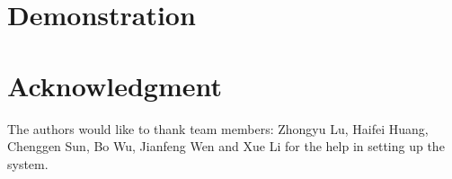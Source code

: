 \documentclass[10pt,conference,balance,letterpaper]{IEEEtran}
\begin{document}
\section{Demonstration}




%




\section*{Acknowledgment}


The authors would like to thank \ring team members: Zhongyu Lu, Haifei Huang, Chenggen Sun, Bo Wu, Jianfeng Wen and Xue Li for the help in setting up the system.







%
%
%




\balance



\end{document}
